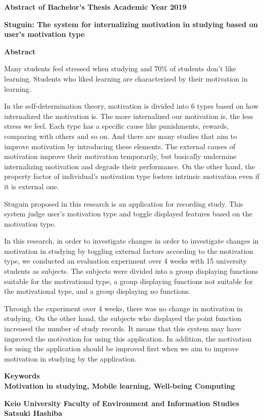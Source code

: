 \begin{center}
\textbf{\large Abstract of Bachelor's Thesis Academic Year 2019}

\vspace{6mm}

\textbf{\large Stuguin: The system for internalizing motivation in studying based on user’s motivation type}
\end{center}

\vspace{10mm}


\begin{flushleft}
\textbf{Abstract}\\
\end{flushleft}

Many students feel stressed when studying and 70\% of students don't like learning.
Students who liked learning are characterized by their motivation in learning.

In the self-determination theory, motivation is divided into 6 types based on how internalized the motivation is. 
The more internalized our motivation is, the less stress we feel. 
Each type has a specific cause like punishments, rewards, comparing with others and so on.
And there are many studies that aim to improve motivation by introducing these elements.
The external causes of motivation improve their motivation temporarily, but basically undermine internalizing motivation and degrade their performance.
On the other hand, the property factor of individual’s motivation type fosters intrinsic motivation even if it is external one.

Stuguin proposed in this research is an application for recording study. 
This system judge user's motivation type and toggle displayed features based on the motivation type.

In this research, in order to investigate changes 
in order to investigate changes in motivation in studying by toggling external factors according to the motivation type, we conducted an evaluation experiment over 4 weeks with 15 university students as subjects. 
The subjects were divided into a group displaying functions suitable for the motivational type, a group displaying functions not suitable for the motivational type, and a group displaying no functions.

Through the experiment over 4 weeks, there was no change in motivation in studying.
On the other hand, the subjects who displayed the point function increased the number of study records. 
It means that this system may have improved the motivation for using this application.
In addition, the motivation for using the application should be improved first when we aim to improve motivation in studying by the application.

\begin{flushleft}
\textbf{Keywords}\\
\textbf{Motivation in studying, Mobile learning, Well-being Computing}
\end{flushleft}

\begin{flushright}
\textbf{Keio University Faculty of Environment and Information Studies}\\
\textbf{Satsuki Hashiba}\\
\end{flushright}